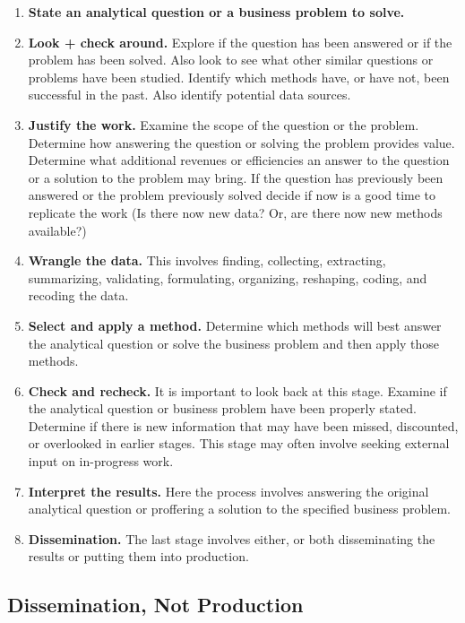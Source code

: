 \documentclass[
]{article}
\providecommand{\tightlist}{%
  \setlength{\itemsep}{0pt}\setlength{\parskip}{0pt}}\usepackage{longtable,booktabs,array}
\begin{document}
\begin{enumerate}
\def\labelenumi{\arabic{enumi}.}
\tightlist
\item
  \textbf{State an analytical question or a business problem to solve.}
\item
  \textbf{Look + check around.} Explore if the question has been
  answered or if the problem has been solved. Also look to see what
  other similar questions or problems have been studied. Identify which
  methods have, or have not, been successful in the past. Also identify
  potential data sources.
\item
  \textbf{Justify the work.} Examine the scope of the question or the
  problem. Determine how answering the question or solving the problem
  provides value. Determine what additional revenues or efficiencies an
  answer to the question or a solution to the problem may bring. If the
  question has previously been answered or the problem previously solved
  decide if now is a good time to replicate the work (Is there now new
  data? Or, are there now new methods available?)
\item
  \textbf{Wrangle the data.} This involves finding, collecting,
  extracting, summarizing, validating, formulating, organizing,
  reshaping, coding, and recoding the data.
\item
  \textbf{Select and apply a method.} Determine which methods will best
  answer the analytical question or solve the business problem and then
  apply those methods.
\item
  \textbf{Check and recheck.} It is important to look back at this
  stage. Examine if the analytical question or business problem have
  been properly stated. Determine if there is new information that may
  have been missed, discounted, or overlooked in earlier stages. This
  stage may often involve seeking external input on in-progress work.
\item
  \textbf{Interpret the results.} Here the process involves answering
  the original analytical question or proffering a solution to the
  specified business problem.
\item
  \textbf{Dissemination.} The last stage involves either, or both
  disseminating the results or putting them into production.
\end{enumerate}

\subsection{Dissemination, Not
Production}\label{dissemination-not-production}
\end{document}

